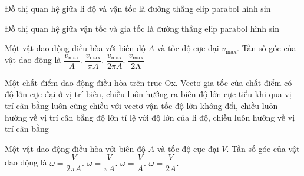\begin{ex}
	Đồ thị quan hệ giữa li độ và vận tốc là đường
	\choice
	{thẳng}
	{\True elip}
	{parabol}
	{hình sin}
\end{ex}

\begin{ex}
	Đồ thị quan hệ giữa vận tốc và gia tốc là đường
	\choice
	{thẳng}
	{\True elip}
	{parabol}
	{hình sin}
\end{ex}


\begin{ex}
	Một vật dao động điều hòa với biên độ $A$ và tốc độ cực đại $v_{\max}.$ Tần số góc của vật dao động là
	\choice
	{\True $\dfrac{v_{\max}}{A}.$}
	{$\dfrac{v_{\max}}{\pi A}.$}
	{$\dfrac{v_{\max}}{2\pi A}.$}
	{$\dfrac{v_{\max}}{\text{2A}}\text{}$}
\end{ex}

\begin{ex}
	Một chất điểm dao động điều hòa trên trục Ox. Vectơ gia tốc của chất điểm có
	\choice
	{độ lớn cực đại ở vị trí biên, chiều luôn hướng ra biên}
	{độ lớn cực tiểu khi qua vị trí cân bằng luôn cùng chiều với vectơ vận tốc}
	{độ lớn không đổi, chiều luôn hướng về vị trí cân bằng}
	{\True độ lớn tỉ lệ với độ lớn của li độ, chiều luôn hướng về vị trí cân bằng}
\end{ex}

\begin{ex}
	Một vật dao động điều hòa với biên độ $A$ và tốc độ cực đại $V$. Tần số góc của vật dao động là
	\choice
	{$\omega =\dfrac{V}{2\pi A}.$}
	{$\omega =\dfrac{V}{\pi A}.$}
	{\True $\omega =\dfrac{V}{A}.$}
	{$\omega =\dfrac{V}{2A}.$}
\end{ex}

